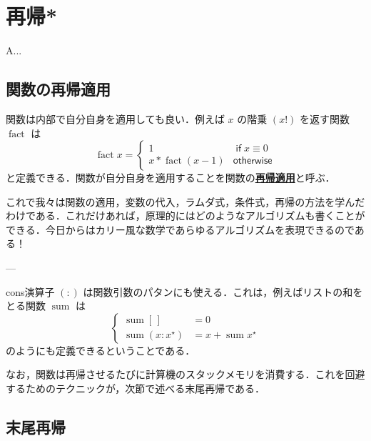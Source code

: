 \documentclass[a4paper,twocolumn]{jsbook}
\newenvironment{leader}{\begingroup\gt}{\endgroup}
\newcommand{\keyword}[1]{{\underline{\textbf{#1}}}}
\newcommand{\mKeyword}[1]{\mathsf{#1}} %
\newcommand{\mIfKeyword}{\mKeyword{if}}
\newcommand{\mOtherwiseKeyword}{\mKeyword{otherwise}}
\DeclareMathOperator{\mIf}{\mIfKeyword}
\DeclareMathOperator{\mOtherwise}{\mOtherwiseKeyword}
\newcommand{\mEmptyList}{{[\,]}}
\newcommand{\mSpecialFunc}[1]{\mathrm{#1}}
\DeclareMathOperator{\mFact}{\mSpecialFunc{fact}}
\DeclareMathOperator{\mSum}{\mSpecialFunc{sum}}
\newcommand{\mList}[1]{{#1}^\mathrm{\star}}
\begin{document}
\chapter{再帰*}
\label{ch:recursion}

\begin{leader}
A...
\end{leader}


\section{関数の再帰適用}

関数は内部で自分自身を適用しても良い．例えば $x$ の階乗 $(x!)$ を返す関数 $\mFact$ は
\begin{equation}
\mFact x=\begin{cases}
1&\mIf x\equiv0\\
x*\mFact(x-1)&\mOtherwise
\end{cases}
\end{equation}
と定義できる．関数が自分自身を適用することを関数の\keyword{再帰適用}と呼ぶ．

これで我々は関数の適用，変数の代入，ラムダ式，条件式，再帰の方法を学んだわけである．これだけあれば，原理的にはどのようなアルゴリズムも書くことができる．今日からはカリー風な数学であらゆるアルゴリズムを表現できるのである！

---

cons演算子 $(:)$ は関数引数のパタンにも使える．これは，例えばリストの和をとる関数 $\mSum$ は
\begin{equation}
\left\{
\begin{aligned}
\mSum\mEmptyList&=0\\
\mSum(x:\mList{x})&=x+\mSum\mList{x}
\end{aligned}
\right.
\end{equation}
のようにも定義できるということである．

なお，関数は再帰させるたびに計算機のスタックメモリを消費する．これを回避するためのテクニックが，次節で述べる末尾再帰である．

\section{末尾再帰}
\end{document}

